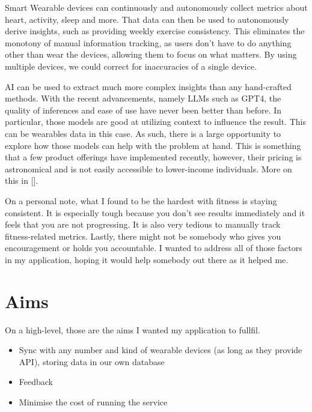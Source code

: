 \par Smart Wearable devices can continuously and autonomously collect metrics about heart, activity, 
sleep and more. That data can then be used to autonomously derive insights, such as providing weekly exercise consistency. 
This eliminates the monotony of manual information tracking, as users don't have to do anything other than wear the devices,
 allowing them to focus on what matters. By using multiple devices, we could correct for inaccuracies of a single device. 

\par AI can be used to extract much more complex insights than any hand-crafted methods. With the recent advancements,
 namely LLMs such as GPT4, the quality of inferences and ease of use have never been better than before. In particular,
 those models are good at utilizing context to influence the result. 
 This can be wearables data in this case. As such, there is a large opportunity to explore 
 how those models can help with the problem at hand. This is something that a few product offerings 
 have implemented recently, however, their pricing is astronomical and is not easily accessible to lower-income individuals. More on this in [].


On a personal note, what I found to be the hardest with fitness is staying consistent. It is especially tough because you don't 
see results immediately and it feels that you are not progressing. It is also very tedious to manually track fitness-related metrics.
Lastly, there might not be somebody who gives you encouragement or holds you accountable. I wanted to address all of those factors in my application, hoping it would help somebody out there as it helped me.
\section{Aims}
On a high-level, those are the aims I wanted my application to fullfil.
\begin{itemize}
    \item {Sync with any number and kind of wearable devices (as long as they provide API), storing data in our own database}
    \item {Feedback }
    \item {Minimise the cost of running the service}
\end{itemize}

